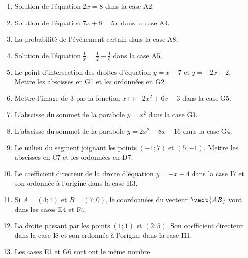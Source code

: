 \begin{exercice}
\begin{multicols}{2}
    \begin{enumerate}
        \item
            Solution de l'équation \( 2x=8\) dans la case A2.
        \item
            Solution de l'équation \( 7x+8=5x\) dans la case A9.
        \item
            La probabilité de l'événement certain dans la case A8.
        \item
            Solution de l'équation \( \frac{1}{ x }=\frac{1}{ 2 }-\frac{1}{ 6 }\) dans la case A5.
        \item
            Le point d'intersection des droites d'équation \( y=x-7\) et \( y=-2x+2\). Mettre les abscisses en G1 et les ordonnées en G2.
        \item
            Mettre l'image de \( 3\) par la fonction \( x\mapsto -2x^2+6x-3\) dans la case G5.
        \item
            L'abscisse du sommet de la parabole \( y=x^2\) dans la case G9.
        \item
            L'abscisse du sommet de la parabole \( y=2x^2+8x-16\) dans la case G4.
        \item
            Le milieu du segment joignant les points \( (-1;7)\) et \( (5;-1)\). Mettre les abscisses en C7 et les ordonnées en D7.
        \item
            Le coefficient directeur de la droite d'équation \( y=-x+4\) dans la case I7 et son ordonnée à l'origine dans la case H3.
        \item
            Si \( A=(4;4)\) et \( B=(7;0)\), le coordonnées du vecteur \( \vect{ AB }\) vont dans les cases E4 et F4.
        \item
            La droite passant par les points \( (1;1)\) et \( (2;5)\). Son coefficient directeur dans la case I8 et son ordonnée à l'origine dans la case H1.
        \item
            Les cases E1 et G6 sont ont le même nombre.
    \end{enumerate}
\end{multicols}


\end{exercice}
